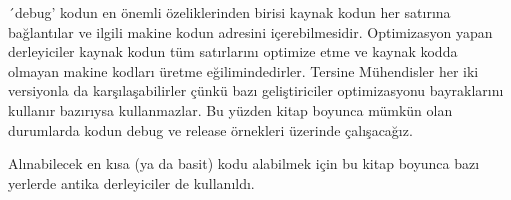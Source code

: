 ´debug' kodun en önemli özeliklerinden birisi kaynak kodun her satırına bağlantılar ve ilgili makine kodun adresini içerebilmesidir. Optimizasyon yapan derleyiciler kaynak kodun tüm satırlarını optimize etme ve kaynak kodda olmayan makine kodları üretme eğilimindedirler. Tersine Mühendisler her iki versiyonla da karşılaşabilirler çünkü bazı geliştiriciler optimizasyonu bayraklarını kullanır bazırıysa kullanmazlar.
Bu yüzden kitap boyunca mümkün olan durumlarda kodun debug ve release örnekleri üzerinde çalışacağız.

Alınabilecek en kısa (ya da basit) kodu alabilmek için bu kitap boyunca bazı yerlerde antika derleyiciler de kullanıldı.
